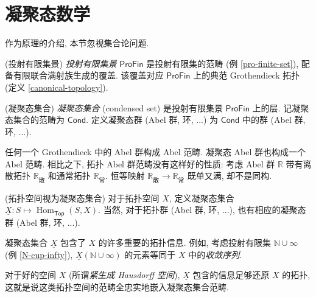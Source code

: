 \section{凝聚态数学}


作为原理的介绍, 本节忽视集合论问题.

\begin{definition}
	{(投射有限集景)}
	\emph{投射有限集景} $\mathsf{ProFin}$ 是投射有限集的范畴 (例 \ref{pro-finite-set}), 配备有限联合满射族生成的覆盖. 该覆盖对应 $\mathsf {ProFin}$ 上的典范 Grothendieck 拓扑 (定义 \ref{canonical-topology}).
\end{definition}



\begin{definition}
	{(凝聚态集合)}
	\emph{凝聚态集合} (condensed set) 是投射有限集景 $\mathsf{ProFin}$ 上的层. 记凝聚态集合的范畴为 $\mathsf{Cond}$.
	定义凝聚态群 (Abel 群, 环, ...) 为 $\mathsf{Cond}$ 中的群 (Abel 群, 环, ...).
\end{definition}

任何一个 Grothendieck \topos{}中的 Abel 群构成 Abel 范畴. 凝聚态 Abel 群也构成一个 Abel 范畴. 相比之下, 拓扑 Abel 群范畴没有这样好的性质: 考虑 Abel 群 $\mathbb{R}$ 带有离散拓扑 $\mathbb{R}_{\text{散}}$ 和通常拓扑 $\mathbb{R}_{\text{常}}$. 恒等映射 $\mathbb{R}_{\text{散}}\to \mathbb{R}_{\text{常}}$ 既单又满, 却不是同构.

\begin{example}
	[label={top-space-as-cond-set}]
	{(拓扑空间视为凝聚态集合)}
	对于拓扑空间 $X$, 定义凝聚态集合 $\underline{X}\colon S\mapsto \operatorname{Hom}_{\mathsf {Top}}(S,X)$.
	当然, 对于拓扑群 (Abel 群, 环, ...), 也有相应的凝聚态群 (Abel 群, 环, ...).
	
	凝聚态集合 $\underline{X}$ 包含了 $X$ 的许多重要的拓扑信息. 例如, 考虑投射有限集 $\mathbb{N}\cup\infty$ (例 \ref{N-cup-infty}), $\underline{X}(\mathbb{N}\cup\infty)$ 的元素等同于 $X$ 中的\emph{收敛序列}.
	
	对于好的空间 $X$ (所谓\emph{紧生成 Hausdorff 空间}), $\underline{X}$ 包含的信息足够还原 $X$ 的拓扑, 这就是说这类拓扑空间的范畴全忠实地嵌入凝聚态集合范畴.
\end{example}

